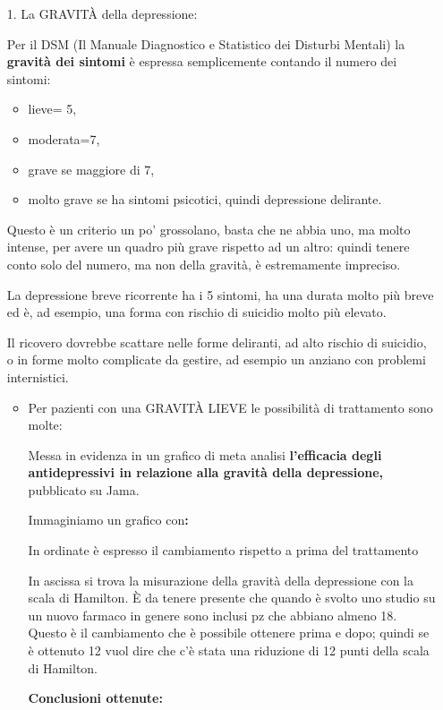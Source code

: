 \begin{itemize}
\item[1.]
La GRAVITÀ della depressione:

  Per il DSM (Il Manuale Diagnostico e Statistico dei Disturbi Mentali)
  la \textbf{gravità dei sintomi} è espressa semplicemente contando il
  numero dei sintomi:

\begin{itemize}
\item
  lieve= 5,
\item
  moderata=7,
\item
  grave se maggiore di 7,
\item
  molto grave se ha sintomi psicotici, quindi depressione delirante.
\end{itemize}

  Questo è un criterio un po' grossolano, basta che ne abbia uno, ma
  molto intense, per avere un quadro più grave rispetto ad un altro:
  quindi tenere conto solo del numero, ma non della gravità, è
  estremamente impreciso.

  La depressione breve ricorrente ha i 5 sintomi, ha una durata molto
  più breve ed è, ad esempio, una forma con rischio di suicidio molto
  più elevato.

  Il ricovero dovrebbe scattare nelle forme deliranti, ad alto rischio
  di suicidio, o in forme molto complicate da gestire, ad esempio un
  anziano con problemi internistici.

\begin{itemize}
\item
  Per pazienti con una GRAVITÀ LIEVE le possibilità di trattamento sono
  molte:

Messa in evidenza in un grafico di meta analisi \textbf{l'efficacia
degli antidepressivi in relazione alla gravità della depressione,}
pubblicato su Jama.

Immaginiamo un grafico con\textbf{:}

In ordinate è espresso il cambiamento rispetto a prima del trattamento

In ascissa si trova la misurazione della gravità della depressione con
la scala di Hamilton. È da tenere presente che quando è svolto uno
studio su un nuovo farmaco in genere sono inclusi pz che abbiano almeno
18. Questo è il cambiamento che è possibile ottenere prima e dopo;
quindi se è ottenuto 12 vuol dire che c'è stata una riduzione di 12
punti della scala di Hamilton.

\textbf{Conclusioni ottenute:}


\end{itemize}
\end{itemize}
